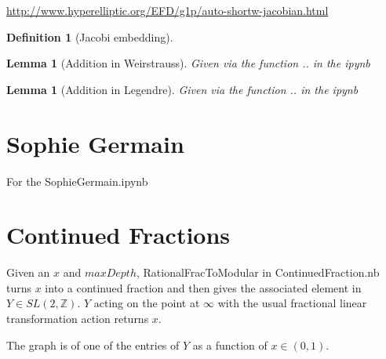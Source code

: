\documentclass[11pt]{article}
\theoremstyle{change}
\newtheorem{definition}[equation]{Definition}
\newtheorem{lemma}[equation]{Lemma}
\theoremstyle{nonumberplain}
\numberwithin{equation}{section}
\begin{document}
\url{http://www.hyperelliptic.org/EFD/g1p/auto-shortw-jacobian.html}

\begin{definition}[Jacobi embedding]
\end{definition}

\begin{lemma}[Addition in Weirstrauss]
Given via the function .. in the ipynb
\end{lemma}

\begin{lemma}[Addition in Legendre]
Given via the function .. in the ipynb
\end{lemma}

\section{Sophie Germain}

For the SophieGermain.ipynb

\section{Continued Fractions}

Given an $x$ and $maxDepth$, RationalFracToModular in ContinuedFraction.nb turns $x$ into a continued fraction and then gives the associated element in $Y \in SL(2,\mathbb{Z})$. $Y$ acting on the point at $\infty$ with the usual fractional linear transformation action returns $x$.

The graph is of one of the entries of $Y$ as a function of $x \in (0,1)$.
\end{document}
